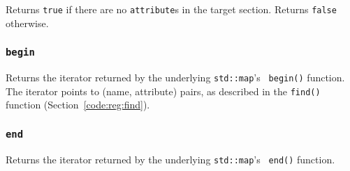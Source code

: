 
Returns {\tt true} if there are no {\tt attribute}s in the target
section.  Returns {\tt false} otherwise.


\subsubsection[begin]{{\tt begin}}


Returns the iterator returned by the underlying {\tt std::map}'s {\tt
begin()} function.
%
The iterator points to (name, attribute) pairs, as described in the
{\tt find()} function (Section~\ref{code:reg:find}).

\subsubsection[end]{{\tt end}}
\label{code:sec:end}


Returns the iterator returned by the underlying {\tt std::map}'s {\tt
end()} function.


